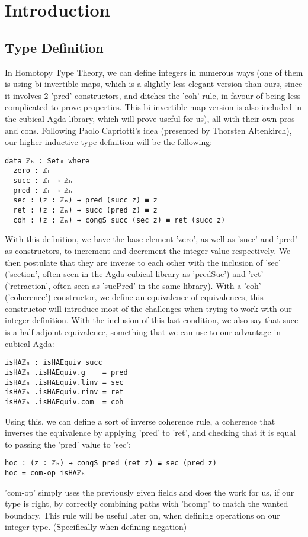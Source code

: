 \chapter{Introduction}
\label{ch:intro}

\section{Type Definition}

In Homotopy Type Theory, we can define integers in numerous ways (one of them is using bi-invertible maps, which is a slightly less elegant version than ours\cite{10.1145/3373718.3394760}, since it involves 2 'pred' constructors, and ditches the 'coh' rule, in favour of being less complicated to prove properties. This bi-invertible map version is also included in the cubical Agda library\cite{biinv-agda}, which will prove useful for us), all with their own pros and cons. Following Paolo Capriotti's idea (presented by Thorsten Altenkirch\cite{bonn_2018}), our higher inductive type definition will be the following:
\begin{verbatim}
data ℤₕ : Set₀ where
  zero : ℤₕ
  succ : ℤₕ → ℤₕ
  pred : ℤₕ → ℤₕ
  sec : (z : ℤₕ) → pred (succ z) ≡ z
  ret : (z : ℤₕ) → succ (pred z) ≡ z
  coh : (z : ℤₕ) → congS succ (sec z) ≡ ret (succ z)
\end{verbatim}
With this definition, we have the base element 'zero', as well as 'succ' and 'pred' as constructors, to increment and decrement the integer value respectively. We then postulate that they are inverse to each other with the inclusion of 'sec' ('section', often seen in the Agda cubical library as 'predSuc') and 'ret' ('retraction', often seen as 'sucPred' in the same library). With a 'coh' ('coherence') constructor, we define an equivalence of equivalences, this constructor will introduce most of the challenges when trying to work with our integer definition. With the inclusion of this last condition, we also say that succ is a half-adjoint equivalence, something that we can use to our advantage in cubical Agda:
\begin{verbatim}
isHAℤₕ : isHAEquiv succ
isHAℤₕ .isHAEquiv.g    = pred
isHAℤₕ .isHAEquiv.linv = sec
isHAℤₕ .isHAEquiv.rinv = ret
isHAℤₕ .isHAEquiv.com  = coh
\end{verbatim}
Using this, we can define a sort of inverse coherence rule, a coherence that inverses the equivalence by applying 'pred' to 'ret', and checking that it is equal to passing the 'pred' value to 'sec':
\begin{verbatim}
hoc : (z : ℤₕ) → congS pred (ret z) ≡ sec (pred z)
hoc = com-op isHAℤₕ
\end{verbatim}
'com-op' simply uses the previously given fields and does the work for us, if our type is right, by correctly combining paths with 'hcomp' to match the wanted boundary.
This rule will be useful later on, when defining operations on our integer type. (Specifically when defining negation)

